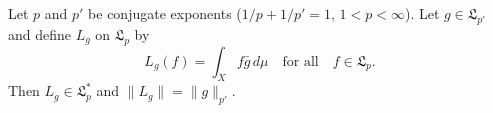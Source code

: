 Let $p$ and $p'$ be conjugate exponents ($1/p + 1/p' = 1$, $1 < p < \infty$). Let $g \in \mathfrak{L}_{p'}$ and define $L_g$ on $\mathfrak{L}_p$ by
$$L_g(f) = \int_X f \bar{g} \, d\mu \quad \text{for all} \quad f \in \mathfrak{L}_p.$$
Then $L_g \in \mathfrak{L}_p^*$ and $\|L_g\| = \|g\|_{p'}$.
